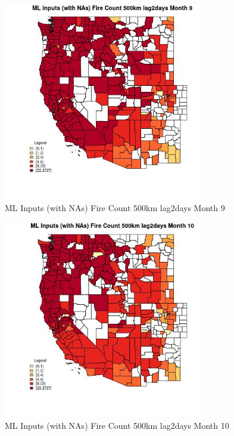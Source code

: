 \clearpage 

\begin{figure} 
\centering  
\includegraphics[width=0.77\textwidth]{Code_Outputs/Report_ML_input_PM25_Step4_part_f_de_duplicated_aves_prioritize_24hr_obswNAs_CountyFire_Count_500km_lag2daysmedianMonth9.jpg} 
\caption{\label{fig:Report_ML_input_PM25_Step4_part_f_de_duplicated_aves_prioritize_24hr_obswNAsCountyFire_Count_500km_lag2daysmedianMonth9}ML Inputs (with NAs) Fire Count 500km lag2days Month 9} 
\end{figure} 
 

\begin{figure} 
\centering  
\includegraphics[width=0.77\textwidth]{Code_Outputs/Report_ML_input_PM25_Step4_part_f_de_duplicated_aves_prioritize_24hr_obswNAs_CountyFire_Count_500km_lag2daysmedianMonth10.jpg} 
\caption{\label{fig:Report_ML_input_PM25_Step4_part_f_de_duplicated_aves_prioritize_24hr_obswNAsCountyFire_Count_500km_lag2daysmedianMonth10}ML Inputs (with NAs) Fire Count 500km lag2days Month 10} 
\end{figure} 
 

